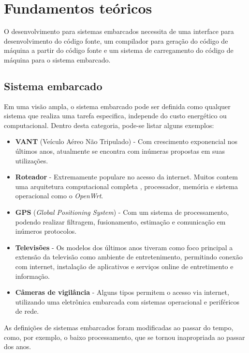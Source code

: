\chapter{Fundamentos teóricos}

O desenvolvimento para sistemas embarcados necessita de uma interface para desenvolvimento do código fonte, um compilador para geração do código de máquina a partir do código fonte e um sistema de carregamento do código de máquina para o sistema embarcado.

\section{Sistema embarcado}

Em uma visão ampla, o sistema embarcado pode ser definida como qualquer sistema que realiza uma tarefa especifica, independe do custo energético ou computacional\cite{barr2006programming}. Dentro desta categoria, pode-se listar alguns exemplos:

\begin{itemize}
\item \textbf{VANT} (Veículo Aéreo Não Tripulado) - Com crescimento exponencial nos últimos anos, atualmente se encontra com inúmeras propostas em suas utilizações.
\item \textbf{Roteador} - Extremamente populare no acesso da internet. Muitos contem uma arquitetura computacional completa , processador, memória e sistema operacional como o \textit{OpenWrt}\cite{openwrt}.
\item \textbf{GPS} (\textit{Global Positioning System}) - Com um sistema de processamento, podendo realizar filtragem, fusionamento, estimação e comunicação em inúmeros protocolos.
\item \textbf{Televisões} - Os modelos dos últimos anos tiveram como foco principal a extensão da televisão como ambiente de entretenimento, permitindo conexão com internet, instalação de aplicativos e serviços online de entretimento e informação.
\item \textbf{Câmeras de vigilância} - Alguns tipos permitem o acesso via internet, utilizando uma eletrônica embarcada com sistemas operacional e periféricos de rede.
\end{itemize}


As definições de sistemas embarcados foram modificadas ao passar do tempo, como, por exemplo, o baixo processamento, que se tornou inapropriada ao passar dos anos\cite{aiimpacts}.

